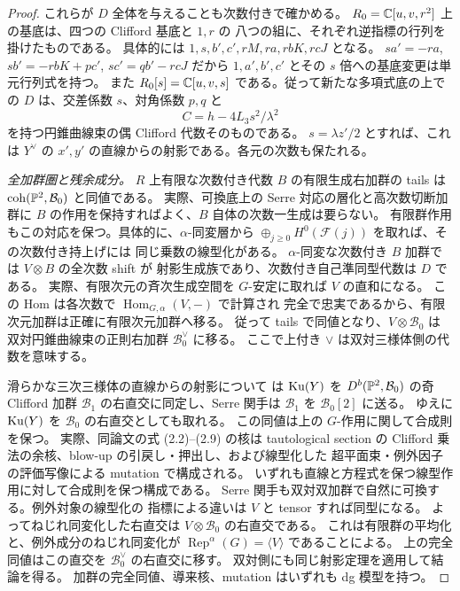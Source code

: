 \begin{proof}
これらが $D$ 全体を与えることも次数付きで確かめる。
$R_0=\mathbb C[u,v,r^2]$ 上の基底は、四つの Clifford 基底と $1,r$ の
八つの組に、それぞれ逆指標の行列を掛けたものである。
具体的には $1,s,b',c',rM,ra,rbK,rcJ$ となる。
$s a'=-ra$, $s b'=-rbK+p c'$, $s c'=q b'-rcJ$ だから
$1,a',b',c'$ とその $s$ 倍への基底変更は単元行列式を持つ。
また $R_0[s]=\mathbb C[u,v,s]$ である。従って新たな多項式底の上での
$D$ は、交差係数 $s$、対角係数 $p,q$ と
\[
 C=h-4L_3s^2/\lambda^2
\]
を持つ円錐曲線束の偶 Clifford 代数そのものである。
$s=\lambda z'/2$ とすれば、これは $Y^\vee$ の
$x',y'$ の直線からの射影である。各元の次数も保たれる。

\emph{全加群圏と残余成分。}
$R$ 上有限な次数付き代数 $B$ の有限生成右加群の tails は
$\operatorname{coh}(\mathbb P^2,\mathcal B_0)$ と同値である。
実際、可換底上の Serre 対応の層化と高次数切断加群に
$B$ の作用を保持すればよく、$B$ 自体の次数一生成は要らない。
有限群作用もこの対応を保つ。具体的に、$\alpha$-同変層から
$\oplus_{j\ge0}H^0(\mathcal F(j))$ を取れば、その次数付き持上げには
同じ乗数の線型化がある。
$\alpha$-同変な次数付き $B$ 加群では $V\otimes B$ の全次数 shift が
射影生成族であり、次数付き自己準同型代数は $D$ である。
実際、有限次元の斉次生成空間を $G$-安定に取れば $V$ の直和になる。
この Hom は各次数で $\operatorname{Hom}_{G,\alpha}(V,-)$ で計算され
完全で忠実であるから、有限次元加群は正確に有限次元加群へ移る。
従って tails で同値となり、$V\otimes\mathcal B_0$ は
双対円錐曲線束の正則右加群 $\mathcal B_0^\vee$ に移る。
ここで上付き $\vee$ は双対三様体側の代数を意味する。

滑らかな三次三様体の直線からの射影について
\cite[Section~2.1, Proposition~2.9]{NFMThreefoldCategoricalTorelli}は
$\operatorname{Ku}(Y)$ を $D^b(\mathbb P^2,\mathcal B_0)$ の奇 Clifford 加群
$\mathcal B_1$ の右直交に同定し、Serre 関手は
$\mathcal B_1$ を $\mathcal B_0[2]$ に送る。
ゆえに $\operatorname{Ku}(Y)$ を $\mathcal B_0$ の右直交としても取れる。
この同値は上の $G$-作用に関して合成則を保つ。
実際、同論文の式 (2.2)--(2.9) の核は tautological section の
Clifford 乗法の余核、blow-up の引戻し・押出し、および線型化した
超平面束・例外因子の評価写像による mutation で構成される。
いずれも直線と方程式を保つ線型作用に対して合成則を保つ構成である。
Serre 関手も双対双加群で自然に可換する。例外対象の線型化の
指標による違いは $V$ と tensor すれば同型になる。
よってねじれ同変化した右直交は $V\otimes\mathcal B_0$ の右直交である。
これは有限群の平均化と、例外成分のねじれ同変化が
$\operatorname{Rep}^\alpha(G)=\langle V\rangle$ であることによる。
上の完全同値はこの直交を $\mathcal B_0^\vee$ の右直交に移す。
双対側にも同じ射影定理を適用して結論を得る。
加群の完全同値、導来核、mutation はいずれも dg 模型を持つ。
\end{proof}

